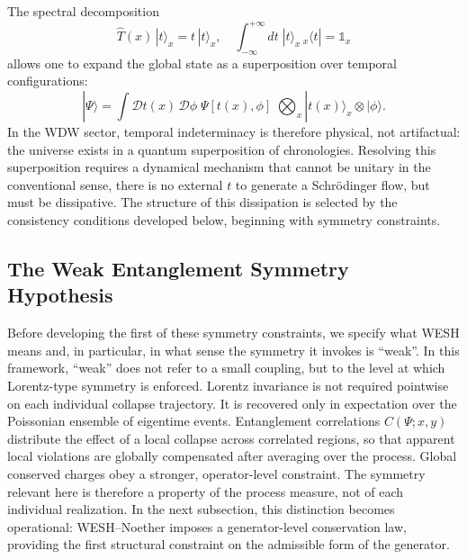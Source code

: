 \documentclass[12pt,a4paper]{article}
\numberwithin{equation}{section}
\begin{document}
\noindent The spectral decomposition
\begin{equation}
\hat{T}(x)\,|t\rangle_x = t\,|t\rangle_x, \quad
\int_{-\infty}^{+\infty}\!dt\; |t\rangle_x\,{}_x\langle t| = \mathbb{1}_x
\label{eq:decomposition}
\end{equation}
allows one to expand the global state as a superposition over temporal
configurations:
\begin{equation}
|\Psi\rangle = \!\int\!\mathcal{D}t(x)\,\mathcal{D}\phi\;
\Psi[t(x),\phi]\;\bigotimes_x |t(x)\rangle_x\!\otimes|\phi\rangle.
\label{eq:expansion}
\end{equation}
In the WDW sector, temporal indeterminacy is therefore physical, not
artifactual: the universe exists in a quantum superposition of chronologies.
Resolving this superposition requires a dynamical mechanism that cannot be
unitary in the conventional sense, there is no external $t$ to generate a
Schr\"odinger flow, but must be dissipative. The structure of this dissipation is selected by the
consistency conditions developed below, beginning with symmetry
constraints.

\vspace{0.5cm}
\subsection{The Weak Entanglement Symmetry Hypothesis}
\vspace{0.3cm}

Before developing the first of these symmetry constraints, we specify
what WESH means and, in particular, in what sense the symmetry it
invokes is ``weak''. In this framework, ``weak'' does not refer to a small
coupling, but to the level at which Lorentz-type symmetry is enforced.
Lorentz invariance is not required pointwise on each individual collapse
trajectory. It is recovered only in expectation over the Poissonian ensemble
of eigentime events. Entanglement correlations $C(\Psi;x,y)$ distribute the
effect of a local collapse across correlated regions, so that apparent local
violations are globally compensated after averaging over the process. Global
conserved charges obey a stronger, operator-level constraint. The symmetry
relevant here is therefore a property of the process measure, not of each
individual realization. In the next subsection, this distinction becomes
operational: WESH--Noether imposes a generator-level conservation law,
providing the first structural constraint on the admissible form of the
generator.
\vspace{0.5cm}
\end{document}
